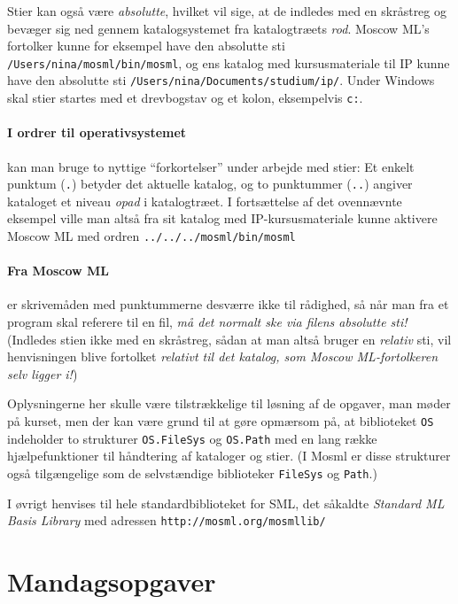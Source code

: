 \documentclass[a4paper]{article}
\begin{document}
Stier kan ogs{\aa} v{\ae}re \emph{absolutte}, hvilket vil sige,
at de indledes med en skr{\aa}streg og bev{\ae}ger sig ned gennem
katalogsystemet fra katalogtr{\ae}ets \emph{rod}.  Moscow ML's fortolker kunne
for eksempel have den absolutte sti \texttt{/Users/nina/mosml/bin/mosml},
og ens katalog med kursusmateriale til IP kunne have den absolutte sti
\texttt{/Users/nina/Documents/studium/ip/}. Under Windows skal stier startes med et drevbogstav og et kolon, eksempelvis \texttt{c:}.

\paragraph{I ordrer til operativsystemet}
kan man bruge to nyttige ``forkortelser''
under arbejde med stier:  Et enkelt punktum (\texttt{.}) betyder det aktuelle
katalog, og to punktummer (\texttt{..}) angiver kataloget et niveau
\emph{opad} i katalogtr{\ae}et.  I forts{\ae}ttelse af det ovenn{\ae}vnte
eksempel ville man alts{\aa} fra sit katalog med IP-kursusmateriale kunne
aktivere Moscow ML med ordren \texttt{../../../mosml/bin/mosml}

\paragraph{Fra Moscow ML}
er skrivem{\aa}den med punktummerne desv{\ae}rre ikke til r{\aa}dighed,
s{\aa} n{\aa}r man fra et program skal referere til en fil, \emph{m{\aa}
det normalt ske via filens absolutte sti!}  (Indledes stien ikke med
en skr{\aa}streg, s{\aa}dan at man alts{\aa} bruger en \emph{relativ} sti,
vil henvisningen blive fortolket \emph{relativt til det katalog,
som Moscow ML-fortolkeren selv ligger i!})

Oplysningerne her skulle v{\ae}re tilstr{\ae}kkelige til l{\o}sning
af de opgaver, man m{\o}der p{\aa} kurset, men der kan v{\ae}re
grund til at g{\o}re opm{\ae}rsom p{\aa}, at biblioteket \texttt{OS}
indeholder to strukturer \texttt{OS.FileSys} og \texttt{OS.Path}
med en lang r{\ae}kke hj{\ae}lpefunktioner til h{\aa}ndtering af
kataloger og stier.  (I Mosml er disse strukturer ogs{\aa}
tilg{\ae}ngelige som de selvst{\ae}ndige biblioteker \texttt{FileSys}
og \texttt{Path}.)

I {\o}vrigt henvises til hele standardbiblioteket for SML, det s{\aa}kaldte
\emph{Standard ML Basis Library} med adressen
\texttt{http://mosml.org/mosmllib/}

\newpage
\section{Mandagsopgaver}
\end{document}
